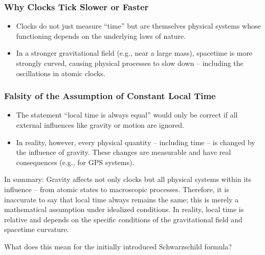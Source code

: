\documentclass[a4paper,12pt]{article}
\begin{document}
	\subsubsection{Why Clocks Tick Slower or Faster}
	\begin{itemize}
		\item Clocks do not just measure ``time'' but are themselves physical systems whose functioning depends on the underlying laws of nature.
		\item In a stronger gravitational field (e.g., near a large mass), spacetime is more strongly curved, causing physical processes to slow down – including the oscillations in atomic clocks.
	\end{itemize}
	
	\subsubsection{Falsity of the Assumption of Constant Local Time}
	\begin{itemize}
		\item The statement ``local time is always equal'' would only be correct if all external influences like gravity or motion are ignored.
		\item In reality, however, every physical quantity – including time – is changed by the influence of gravity. These changes are measurable and have real consequences (e.g., for GPS systems).
	\end{itemize}
	
	In summary: Gravity affects not only clocks but all physical systems within its influence – from atomic states to macroscopic processes. Therefore, it is inaccurate to say that local time always remains the same; this is merely a mathematical assumption under idealized conditions. In reality, local time is relative and depends on the specific conditions of the gravitational field and spacetime curvature.
	
	What does this mean for the initially introduced Schwarzschild formula?
	
\end{document}
